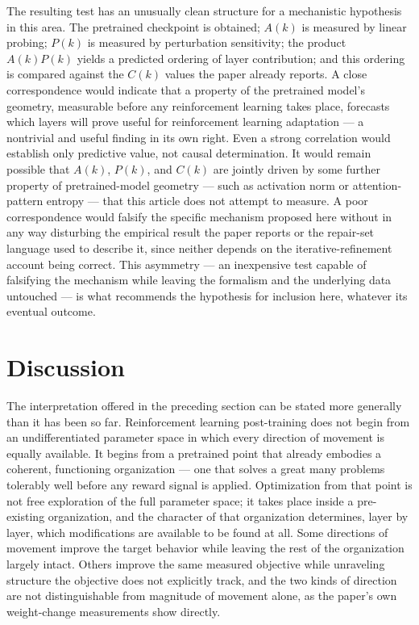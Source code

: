 \documentclass[11pt]{article}
\begin{document}
The resulting test has an unusually clean structure for a mechanistic hypothesis in this area. The pretrained checkpoint is obtained; $A(k)$ is measured by linear probing; $P(k)$ is measured by perturbation sensitivity; the product $A(k)P(k)$ yields a predicted ordering of layer contribution; and this ordering is compared against the $C(k)$ values the paper already reports. A close correspondence would indicate that a property of the pretrained model's geometry, measurable before any reinforcement learning takes place, forecasts which layers will prove useful for reinforcement learning adaptation --- a nontrivial and useful finding in its own right. Even a strong correlation would establish only predictive value, not causal determination. It would remain possible that $A(k)$, $P(k)$, and $C(k)$ are jointly driven by some further property of pretrained-model geometry --- such as activation norm or attention-pattern entropy --- that this article does not attempt to measure. A poor correspondence would falsify the specific mechanism proposed here without in any way disturbing the empirical result the paper reports or the repair-set language used to describe it, since neither depends on the iterative-refinement account being correct. This asymmetry --- an inexpensive test capable of falsifying the mechanism while leaving the formalism and the underlying data untouched --- is what recommends the hypothesis for inclusion here, whatever its eventual outcome.

\section{Discussion}

The interpretation offered in the preceding section can be stated more generally than it has been so far. Reinforcement learning post-training does not begin from an undifferentiated parameter space in which every direction of movement is equally available. It begins from a pretrained point that already embodies a coherent, functioning organization --- one that solves a great many problems tolerably well before any reward signal is applied. Optimization from that point is not free exploration of the full parameter space; it takes place inside a pre-existing organization, and the character of that organization determines, layer by layer, which modifications are available to be found at all. Some directions of movement improve the target behavior while leaving the rest of the organization largely intact. Others improve the same measured objective while unraveling structure the objective does not explicitly track, and the two kinds of direction are not distinguishable from magnitude of movement alone, as the paper's own weight-change measurements show directly.
\end{document}
